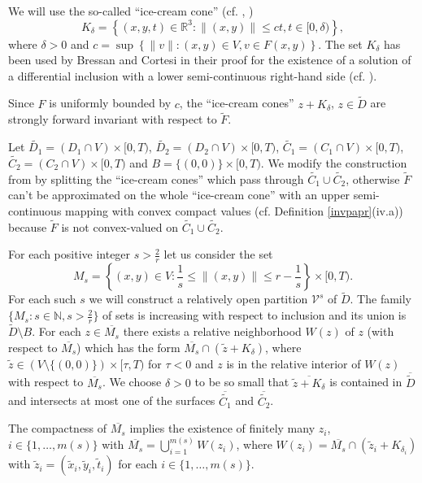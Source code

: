 \documentclass[a4paper]{article}
\begin{document}
We will use the so-called ``ice-cream cone'' (cf. \cite{BC}, \cite{D}) $$K_{\delta} = \left\{(x,y,t) \in \mathbb{R}^3 : \|(x,y)\| \le ct, t \in [0,\delta)\right\},$$ where $\delta > 0$ and $c = \sup\left\{\|v\| : (x,y) \in V, v \in F(x,y)\right\}$. The set $K_{\delta}$ has been used by Bressan and Cortesi in their proof for the existence of a solution of a differential inclusion with a lower semi-continuous right-hand side (cf. \cite{BC}).

Since $F$ is uniformly bounded by $c$, the ``ice-cream cones'' $z+K_\delta$, $z \in \widetilde{D}$ are strongly forward invariant with respect to $\widetilde{F}$.

Let $\widetilde{D_1} = (D_1 \cap V) \times [0,T)$, $\widetilde{D_2} = (D_2 \cap V) \times [0,T)$, $\widetilde{C_1} = (C_1 \cap V) \times [0,T)$, $\widetilde{C_2} = (C_2 \cap V) \times [0,T)$ and $B = \{(0,0)\} \times [0,T)$.
We modify the construction from \cite{KR} by splitting the ``ice-cream cones'' which pass through $\widetilde{C_1} \cup \widetilde{C_2}$, otherwise $\widetilde{F}$ can't be approximated on the whole ``ice-cream cone'' with an upper semi-continuous mapping with convex compact values (cf. Definition \ref{invpapr}(iv.a)) because $\widetilde{F}$ is not convex-valued on $\widetilde{C_1} \cup \widetilde{C_2}$.

For each positive integer $s > \frac{2}{r}$ let us consider the set
$$M_s = \left\{ (x,y) \in V : \frac{1}{s} \le \|(x,y)\| \le r-\frac{1}{s}\right\} \times [0,T).$$
For each such $s$ we will construct a relatively open partition $\mathcal{V}^s$ of $\widetilde{D}$. The family $\{M_s : s \in \mathbb{N}, s > \frac{2}{r} \}$ of sets is increasing with respect to inclusion and its union is $\widetilde{D} \setminus B$.
For each $z \in \overline{M_s}$ there exists a relative neighborhood $W(z)$ of $z$ (with respect to $\overline{M_s}$) which has the form $\overline{M_s} \cap (\widetilde{z}+K_{\delta})$, where $\widetilde{z} \in (V \setminus \{(0,0)\}) \times [\tau,T)$ for $\tau < 0$ and $z$ is in the relative interior of $W(z)$ with respect to $\overline{M_s}$.
We choose $\delta > 0$ to be so small that $\overline{\widetilde{z} + K_{\delta}}$ is contained in $\overline{\widetilde{D}}$ and intersects at most one of the surfaces $\overline{\widetilde{C_1}}$ and $\overline{\widetilde{C_2}}$.

The compactness of $\overline{M_s}$ implies the existence of finitely many $z_i$, $i \in \{1,\dots,m(s)\}$ with $\overline{M_s} = \bigcup_{i=1}^{m(s)} W\left(z_i\right)$, where $W\left(z_i\right) = \overline{M_s} \cap \left(\widetilde{z}_i + K_{\delta_i}\right)$ with $\widetilde{z}_i=\left(\widetilde{x}_i,\widetilde{y}_i,\widetilde{t}_i\right)$ for each $i \in \{1,\dots,m(s)\}$.
\end{document}
